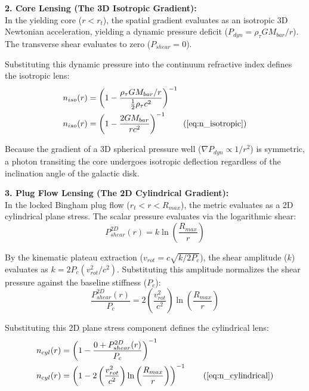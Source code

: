 \textbf{2. Core Lensing (The 3D Isotropic Gradient):} \\
In the yielding core ($r < r_t$), the spatial gradient evaluates as an isotropic 3D Newtonian acceleration, yielding a dynamic pressure deficit ($P_{dyn} = \rho_{\tau} GM_{bar}/r$). The transverse shear evaluates to zero ($P_{shear} = 0$). %

Substituting this dynamic pressure into the continuum refractive index defines the isotropic lens: 
\begin{align}
    n_{iso}(r) &= \left( 1 - \frac{\rho_{\tau} G M_{bar} / r}{\frac{1}{2} \rho_{\tau} c^2} \right)^{-1} \nonumber \\
    n_{iso}(r) &= \left( 1 - \frac{2G M_{bar}}{r c^2} \right)^{-1} \tag{\ref{eq:n_isotropic}}
\end{align}

Because the gradient of a 3D spherical pressure well ($\nabla P_{dyn} \propto 1/r^2$) is symmetric, a photon transiting the core undergoes isotropic deflection regardless of the inclination angle of the galactic disk.

\textbf{3. Plug Flow Lensing (The 2D Cylindrical Gradient):} \\
In the locked Bingham plug flow ($r_t < r < R_{max}$), the metric evaluates as a 2D cylindrical plane stress. The scalar pressure evaluates via the logarithmic shear: 
\begin{equation}
    P_{shear}^{2D}(r) = k \ln \left( \frac{R_{max}}{r} \right) 
\end{equation}

By the kinematic plateau extraction ($v_{rot} = c \sqrt{k / 2P_c}$), the shear amplitude ($k$) evaluates as $k = 2P_c (v_{rot}^2 / c^2)$. Substituting this amplitude normalizes the shear pressure against the baseline stiffness ($P_c$):
\begin{equation}
    \frac{P_{shear}^{2D}(r)}{P_c} = 2 \left(\frac{v_{rot}^2}{c^2}\right) \ln \left( \frac{R_{max}}{r} \right)
\end{equation}

Substituting this 2D plane stress component defines the cylindrical lens: 
\begin{align}
    n_{cyl}(r) &= \left( 1 - \frac{0 + P_{shear}^{2D}(r)}{P_c} \right)^{-1} \nonumber \\
    n_{cyl}(r) &= \left( 1 - 2\left(\frac{v_{rot}^2}{c^2}\right) \ln \left( \frac{R_{max}}{r} \right) \right)^{-1} \tag{\ref{eq:n_cylindrical}} 
\end{align}

